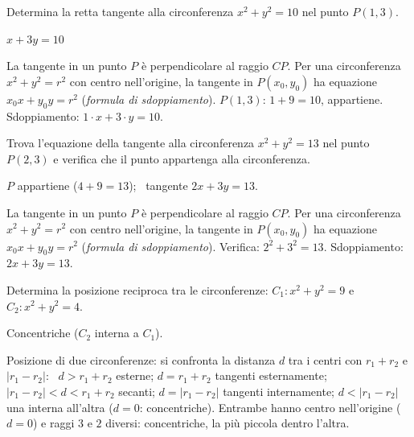 
\begin{question}[ID=4.4, subtitle={Tangente a $x^2+y^2=10$ nel punto $P(1,3)$}, difficulty=media, tags={tangente, circonferenza}]
Determina la retta tangente alla circonferenza $x^2+y^2=10$ nel punto $P(1,3)$.
\begin{solution}
$x+3y=10$
\end{solution}
\begin{explanation}
La tangente in un punto $P$ è perpendicolare al raggio $CP$. Per una circonferenza $x^2+y^2=r^2$ con centro nell'origine, la tangente in $P(x_0,y_0)$ ha equazione $x_0x+y_0y=r^2$ (\emph{formula di sdoppiamento}).
$P(1,3)$: $1+9=10$, appartiene. Sdoppiamento: $1\cdot x+3\cdot y=10$.
\end{explanation}
\end{question}


\begin{question}[ID=4.5, subtitle={Tangente a $x^2+y^2=13$ nel punto $P(2,3)$}, difficulty=media, tags={tangente, circonferenza}]
Trova l'equazione della tangente alla circonferenza $x^2+y^2=13$ nel punto $P(2,3)$ e verifica che il punto appartenga alla circonferenza.
\begin{solution}
$P$ appartiene ($4+9=13$); \ tangente $2x+3y=13$.
\end{solution}
\begin{explanation}
La tangente in un punto $P$ è perpendicolare al raggio $CP$. Per una circonferenza $x^2+y^2=r^2$ con centro nell'origine, la tangente in $P(x_0,y_0)$ ha equazione $x_0x+y_0y=r^2$ (\emph{formula di sdoppiamento}).
Verifica: $2^2+3^2=13$. Sdoppiamento: $2x+3y=13$.
\end{explanation}
\end{question}

\begin{question}[ID=5.1, subtitle={Posizione di $C_1: x^2+y^2=9$ e $C_2: x^2+y^2=4$}, difficulty=facile, tags={circonferenze, posizione reciproca}]
Determina la posizione reciproca tra le circonferenze:
$C_1: x^2+y^2=9$ e $C_2: x^2+y^2=4$.
\begin{solution}
Concentriche ($C_2$ interna a $C_1$).
\end{solution}
\begin{explanation}
Posizione di due circonferenze: si confronta la distanza $d$ tra i centri con $r_1+r_2$ e $|r_1-r_2|$: \ $d>r_1+r_2$ esterne; $d=r_1+r_2$ tangenti esternamente; $|r_1-r_2|<d<r_1+r_2$ secanti; $d=|r_1-r_2|$ tangenti internamente; $d<|r_1-r_2|$ una interna all'altra ($d=0$: concentriche).
Entrambe hanno centro nell'origine ($d=0$) e raggi $3$ e $2$ diversi: concentriche, la più piccola dentro l'altra.
\end{explanation}
\end{question}

